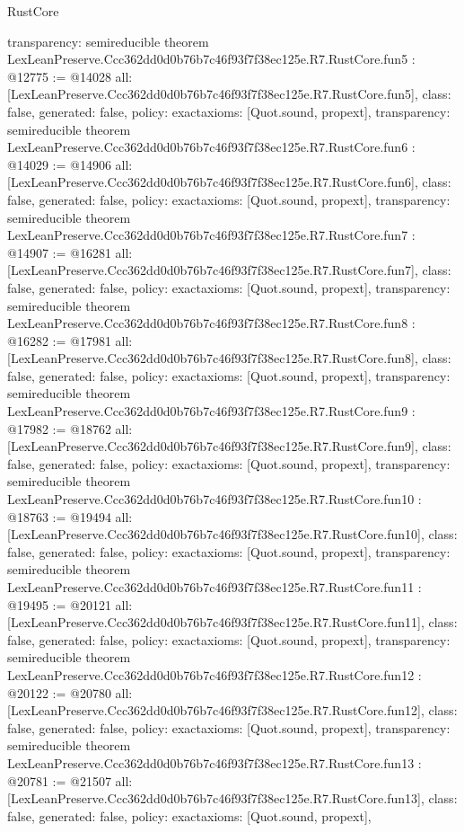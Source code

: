 \begin{lexlean}{RustCore}
\begin{coremodule}
{  transparency: semireducible
}
theorem LexLeanPreserve.Ccc362dd0d0b76b7c46f93f7f38ec125e.R7.RustCore.fun5 : @12775 := @14028 {
  all: [LexLeanPreserve.Ccc362dd0d0b76b7c46f93f7f38ec125e.R7.RustCore.fun5],
  class: false,
  generated: false,
  policy: exact{axioms: [Quot.sound, propext]},
  transparency: semireducible
}
theorem LexLeanPreserve.Ccc362dd0d0b76b7c46f93f7f38ec125e.R7.RustCore.fun6 : @14029 := @14906 {
  all: [LexLeanPreserve.Ccc362dd0d0b76b7c46f93f7f38ec125e.R7.RustCore.fun6],
  class: false,
  generated: false,
  policy: exact{axioms: [Quot.sound, propext]},
  transparency: semireducible
}
theorem LexLeanPreserve.Ccc362dd0d0b76b7c46f93f7f38ec125e.R7.RustCore.fun7 : @14907 := @16281 {
  all: [LexLeanPreserve.Ccc362dd0d0b76b7c46f93f7f38ec125e.R7.RustCore.fun7],
  class: false,
  generated: false,
  policy: exact{axioms: [Quot.sound, propext]},
  transparency: semireducible
}
theorem LexLeanPreserve.Ccc362dd0d0b76b7c46f93f7f38ec125e.R7.RustCore.fun8 : @16282 := @17981 {
  all: [LexLeanPreserve.Ccc362dd0d0b76b7c46f93f7f38ec125e.R7.RustCore.fun8],
  class: false,
  generated: false,
  policy: exact{axioms: [Quot.sound, propext]},
  transparency: semireducible
}
theorem LexLeanPreserve.Ccc362dd0d0b76b7c46f93f7f38ec125e.R7.RustCore.fun9 : @17982 := @18762 {
  all: [LexLeanPreserve.Ccc362dd0d0b76b7c46f93f7f38ec125e.R7.RustCore.fun9],
  class: false,
  generated: false,
  policy: exact{axioms: [Quot.sound, propext]},
  transparency: semireducible
}
theorem LexLeanPreserve.Ccc362dd0d0b76b7c46f93f7f38ec125e.R7.RustCore.fun10 : @18763 := @19494 {
  all: [LexLeanPreserve.Ccc362dd0d0b76b7c46f93f7f38ec125e.R7.RustCore.fun10],
  class: false,
  generated: false,
  policy: exact{axioms: [Quot.sound, propext]},
  transparency: semireducible
}
theorem LexLeanPreserve.Ccc362dd0d0b76b7c46f93f7f38ec125e.R7.RustCore.fun11 : @19495 := @20121 {
  all: [LexLeanPreserve.Ccc362dd0d0b76b7c46f93f7f38ec125e.R7.RustCore.fun11],
  class: false,
  generated: false,
  policy: exact{axioms: [Quot.sound, propext]},
  transparency: semireducible
}
theorem LexLeanPreserve.Ccc362dd0d0b76b7c46f93f7f38ec125e.R7.RustCore.fun12 : @20122 := @20780 {
  all: [LexLeanPreserve.Ccc362dd0d0b76b7c46f93f7f38ec125e.R7.RustCore.fun12],
  class: false,
  generated: false,
  policy: exact{axioms: [Quot.sound, propext]},
  transparency: semireducible
}
theorem LexLeanPreserve.Ccc362dd0d0b76b7c46f93f7f38ec125e.R7.RustCore.fun13 : @20781 := @21507 {
  all: [LexLeanPreserve.Ccc362dd0d0b76b7c46f93f7f38ec125e.R7.RustCore.fun13],
  class: false,
  generated: false,
  policy: exact{axioms: [Quot.sound, propext]},
}
\end{coremodule}
\end{lexlean}
